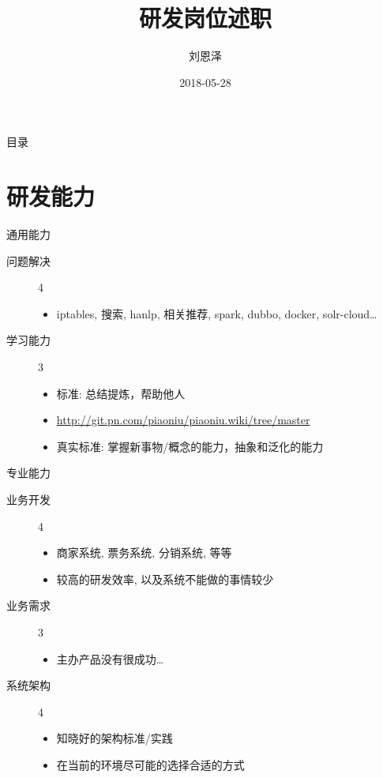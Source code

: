 \documentclass[presentation, bigger]{beamer}
\author{刘恩泽}
\date{2018-05-28}
\title{研发岗位述职}
\begin{document}
\maketitle
\begin{frame}{目录}
\tableofcontents
\end{frame}


\section{研发能力}
\label{sec:org56a8a25}
\begin{frame}[label={sec:org72f7fe4}]{通用能力}
\begin{description}
\item[{问题解决}] 4
\begin{itemize}
\item iptables, 搜索, hanlp, 相关推荐, spark, dubbo, docker, solr-cloud\ldots{}
\end{itemize}
\item[{学习能力}] 3
\begin{itemize}
\item 标准: 总结提炼，帮助他人
\item \url{http://git.pn.com/piaoniu/piaoniu.wiki/tree/master}
\item 真实标准: 掌握新事物/概念的能力，抽象和泛化的能力
\end{itemize}
\end{description}
\end{frame}

\begin{frame}[label={sec:orgf423d39}]{专业能力}
\begin{description}
\item[{业务开发}] 4
\begin{itemize}
\item 商家系统, 票务系统, 分销系统, 等等
\item 较高的研发效率, 以及系统不能做的事情较少
\end{itemize}
\item[{业务需求}] 3
\begin{itemize}
\item 主办产品没有很成功\ldots{}
\end{itemize}
\item[{系统架构}] 4
\begin{itemize}
\item 知晓好的架构标准/实践
\item 在当前的环境尽可能的选择合适的方式
\end{itemize}
\end{description}
\end{frame}
\end{document}
